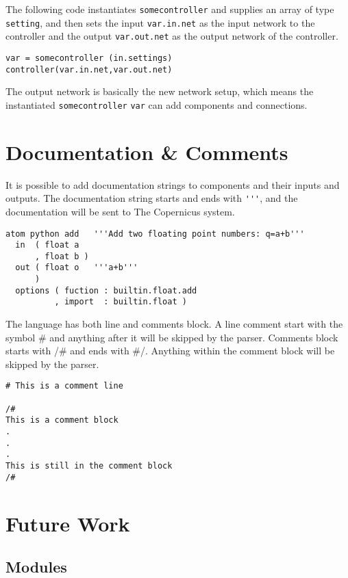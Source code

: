 The following code instantiates \verb#somecontroller# and supplies an
array of type \verb#setting#, and then sets the input
\verb#var.in.net# as the input network to the controller and the
output \verb#var.out.net# as the output network of the controller. 

\begin{verbatim}
var = somecontroller (in.settings)
controller(var.in.net,var.out.net)
\end{verbatim}

The output network is basically the new network setup, which means the
instantiated \verb#somecontroller# \verb#var# can add components and
connections.


\section{Documentation \& Comments}
It is possible to add documentation strings to components and their
inputs and outputs. The documentation string starts and ends with
\verb#'''#, and the documentation will be sent to The Copernicus
system.

\begin{verbatim}
atom python add   '''Add two floating point numbers: q=a+b'''
  in  ( float a
      , float b )
  out ( float o   '''a+b'''
      )
  options ( fuction : builtin.float.add
          , import  : builtin.float )
\end{verbatim}

The language has both line and comments block. A line comment start
with the symbol \# and anything after it will be skipped by the
parser. Comments block starts with /\# and ends with \#/. Anything
within the comment block will be skipped by the parser.

\begin{verbatim}
# This is a comment line

/#
This is a comment block
.
.
.
This is still in the comment block
/#
\end{verbatim}


\section{Future Work}

\subsection{Modules}

